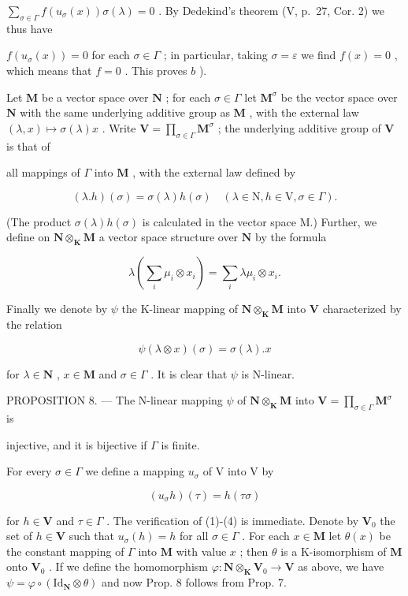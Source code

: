 \(\sum_{\sigma \in \Gamma}f(u_{\sigma}(x))\sigma (\lambda) = 0\) . By Dedekind's theorem (V, p.~27, Cor. 2) we thus have

\(f(u_{\sigma}(x)) = 0\) for each \(\sigma \in \Gamma\) ; in particular, taking \(\sigma = \varepsilon\) we find \(f(x) = 0\) , which means that \(f = 0\) . This proves \(b\) ).

Let \(\mathbf{M}\) be a vector space over \(\mathbf{N}\) ; for each \(\sigma \in \Gamma\) let \(\mathbf{M}^{\sigma}\) be the vector space over \(\mathbf{N}\) with the same underlying additive group as \(\mathbf{M}\) , with the external law \((\lambda, x) \mapsto \sigma(\lambda)x\) . Write \(\mathbf{V} = \prod_{\sigma \in \Gamma} \mathbf{M}^{\sigma}\) ; the underlying additive group of \(\mathbf{V}\) is that of

all mappings of \(\Gamma\) into \(\mathbf{M}\) , with the external law defined by

\[
(\lambda . h) (\sigma) = \sigma (\lambda) h (\sigma) \quad (\lambda \in \mathrm{N}, h \in \mathrm{V}, \sigma \in \Gamma).\tag{5}
\]

(The product \(\sigma(\lambda) h(\sigma)\) is calculated in the vector space M.) Further, we define on \(\mathbf{N} \otimes_{\mathbf{K}} \mathbf{M}\) a vector space structure over \(\mathbf{N}\) by the formula

\[
\lambda \left(\sum_ {i} \mu_ {i} \otimes x _ {i}\right) = \sum_ {i} \lambda \mu_ {i} \otimes x _ {i}.
\]

Finally we denote by \(\psi\) the K-linear mapping of \(\mathbf{N} \otimes_{\mathbf{K}} \mathbf{M}\) into \(\mathbf{V}\) characterized by the relation

\[
\psi (\lambda \otimes x) (\sigma) = \sigma (\lambda). x\tag{6}
\]

for \(\lambda \in \mathbf{N}\) , \(x \in \mathbf{M}\) and \(\sigma \in \Gamma\) . It is clear that \(\psi\) is N-linear.

PROPOSITION 8. --- The N-linear mapping \(\psi\) of \(\mathbf{N} \otimes_{\mathbf{K}} \mathbf{M}\) into \(\mathbf{V} = \prod_{\sigma \in \Gamma} \mathbf{M}^{\sigma}\) is

injective, and it is bijective if \(\Gamma\) is finite.

For every \(\sigma\in\Gamma\) we define a mapping \(u_{\sigma}\) of V into V by

\[
\left(u _ {\sigma} h\right) (\tau) = h (\tau \sigma)\tag{7}
\]

for \(h \in \mathbf{V}\) and \(\tau \in \Gamma\) . The verification of (1)-(4) is immediate. Denote by \(\mathbf{V}_0\) the set of \(h \in \mathbf{V}\) such that \(u_{\sigma}(h) = h\) for all \(\sigma \in \Gamma\) . For each \(x \in \mathbf{M}\) let \(\theta(x)\) be the constant mapping of \(\Gamma\) into \(\mathbf{M}\) with value \(x\) ; then \(\theta\) is a K-isomorphism of \(\mathbf{M}\) onto \(\mathbf{V}_0\) . If we define the homomorphism \(\varphi: \mathbf{N} \otimes_{\mathbf{K}} \mathbf{V}_0 \to \mathbf{V}\) as above, we have \(\psi = \varphi \circ (\mathrm{Id}_{\mathbf{N}} \otimes \theta)\) and now Prop. 8 follows from Prop. 7.

